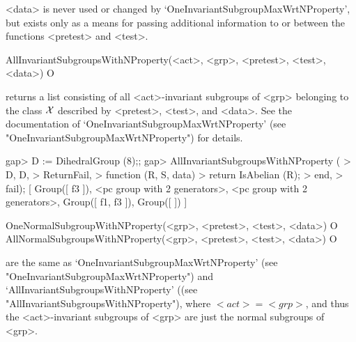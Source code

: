 <data> is never used or changed by `OneInvariantSubgroupMaxWrtNProperty', but
exists only as a means for passing additional information to or between
the functions <pretest> and <test>.

\>AllInvariantSubgroupsWithNProperty(<act>, <grp>, <pretest>, <test>, <data>) O

returns a list consisting of all <act>-invariant subgroups of <grp> belonging 
to the class $\cal X$ described by <pretest>, <test>, and <data>. See
the documentation of `OneInvariantSubgroupMaxWrtNProperty' (see
"OneInvariantSubgroupMaxWrtNProperty") for details.

\beginexample
gap> D := DihedralGroup (8);;
gap> AllInvariantSubgroupsWithNProperty (
> D, D,
>     ReturnFail,
>     function (R, S, data)
>         return IsAbelian (R);
>     end,
>     fail);
[ Group([ f3 ]), <pc group with 2 generators>, <pc group with 2 generators>,
  Group([ f1, f3 ]), Group([  ]) ]
\endexample



\>OneNormalSubgroupWithNProperty(<grp>, <pretest>, <test>, <data>) O
\>AllNormalSubgroupsWithNProperty(<grp>, <pretest>, <test>, <data>) O

are the same as `OneInvariantSubgroupMaxWrtNProperty' (see
"OneInvariantSubgroupMaxWrtNProperty")
and  `AllInvariantSubgroupsWithNProperty' ((see
"AllInvariantSubgroupsWithNProperty"), where $<act> = <grp>$, and thus the
<act>-invariant subgroups of <grp> are just the normal subgroups of <grp>.



